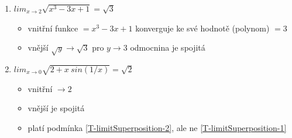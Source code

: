 \begin{example}\noindent
    \begin{enumerate}
        \item $lim_{x\to 2}\sqrt{x^3-3x+1}=\sqrt{3}$
            \begin{itemize}
                \item vnitřní funkce $=x^3-3x+1$ konverguje ke své hodnotě (polynom) $=3$
                \item vnější $\sqrt{y}\rightarrow\sqrt{3}\text{ pro }y\rightarrow 3$ odmocnina je spojitá
            \end{itemize}
        \item $lim_{x\to 0}\sqrt{2+x~sin(1/x)}=\sqrt{2}$
            \begin{itemize}
                \item vnitřní $\rightarrow 2$
                \item vnější je spojitá
                \item platí podmínka \autoref{T-limitSuperposition-2}, ale ne \autoref{T-limitSuperposition-1}
            \end{itemize}
    \end{enumerate}
\end{example}
